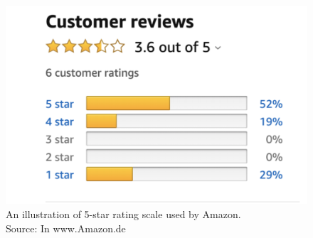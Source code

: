 \begin{figure}
    \centering
    \includegraphics[scale=0.4]{chapters/figures/rating.png}
    \caption{An illustration of 5-star rating scale used by Amazon.\\
    Source: In www.Amazon.de}
    \label{fig:rating}
\end{figure}


